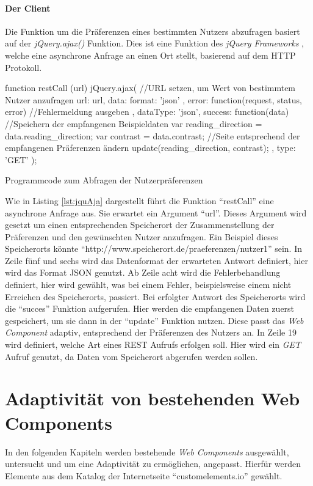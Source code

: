 \documentclass[12pt, paper=a4, bibtotoc, toc=listof, headsepline=true]{scrreprt}
\begin{document}
		\subsubsection{Der Client}
		Die Funktion um die Präferenzen eines bestimmten Nutzers abzufragen basiert auf der \emph{jQuery.ajax()} Funktion. Dies ist eine Funktion des \emph{jQuery Frameworks} , welche eine asynchrone Anfrage an einen Ort stellt, basierend auf dem \ac{HTTP} Protokoll.\cite[vgl.]{jquAja}
		\begin{listing}
			\begin{JavaScriptcode*}{}
function restCall (url){
   jQuery.ajax({
      //URL setzen, um Wert von bestimmtem Nutzer anzufragen
      url: url,
      data: {
         format: 'json'
      },
      error: function(request, status, error) {
         //Fehlermeldung ausgeben
      },
      dataType: 'json',
      success: function(data) {
         //Speichern der empfangenen Beispieldaten
         var reading_direction = data.reading_direction;
         var contrast = data.contrast;
         //Seite entsprechend der empfangenen Präferenzen ändern
         update(reading_direction, contrast);
      },
      type: 'GET'
   });
}
			\end{JavaScriptcode*}
			\caption{Programmcode zum Abfragen der Nutzerpräferenzen}
			\label{lst:jquAja}
		\end{listing}
		Wie in Listing \ref{lst:jquAja} dargestellt führt die Funktion \enquote{restCall} eine asynchrone Anfrage aus. Sie erwartet ein Argument \enquote{url}. Dieses Argument wird gesetzt um einen entsprechenden Speicherort der Zusammenstellung der Präferenzen und den gewünschten Nutzer anzufragen. Ein Beispiel dieses Speicherorts könnte \enquote{http://www.speicherort.de/praeferenzen/nutzer1} sein. In Zeile fünf und sechs wird das Datenformat der erwarteten Antwort definiert, hier wird das Format \ac{JSON} genutzt. Ab Zeile acht wird die Fehlerbehandlung definiert, hier wird gewählt, was bei einem Fehler, beispielsweise einem nicht Erreichen des Speicherorts, passiert. Bei erfolgter Antwort des Speicherorts wird die \enquote{succes} Funktion aufgerufen. Hier werden die empfangenen Daten zuerst gespeichert, um sie dann in der \enquote{update} Funktion nutzen. Diese passt das \emph{Web Component} adaptiv, entsprechend der Präferenzen des Nutzers an. In Zeile 19 wird definiert, welche Art eines \ac{REST} Aufrufs erfolgen soll. Hier wird ein \emph{GET} Aufruf genutzt, da Daten vom Speicherort abgerufen werden sollen.
\chapter{Adaptivität von bestehenden Web Components}
	In den folgenden Kapiteln werden bestehende \emph{Web Components} ausgewählt, untersucht und um eine Adaptivität zu ermöglichen, angepasst. Hierfür werden Elemente aus dem Katalog der Internetseite \enquote{customelements.io} gewählt.\cite{cusEleIo}
\end{document}

